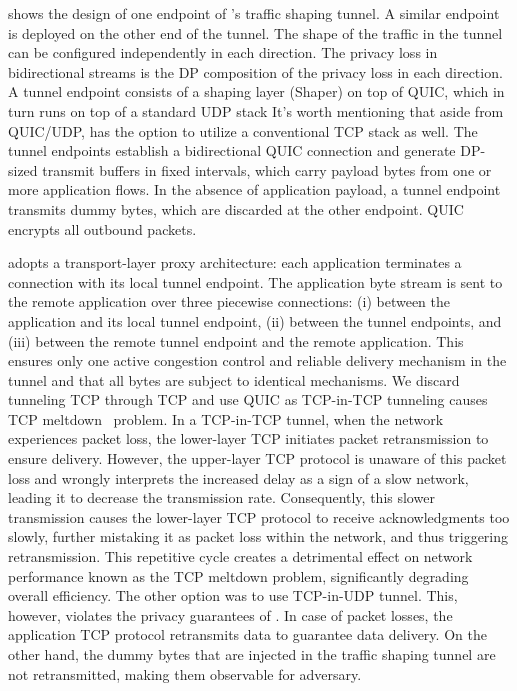  shows the design of one endpoint of {\sys}’s traffic shaping tunnel. A similar endpoint is deployed on the other end of the tunnel.
The shape of the traffic in the tunnel can be configured independently in each direction. The privacy loss in bidirectional streams is the DP composition of the privacy loss in each direction.
A tunnel endpoint consists of a shaping layer (Shaper) on top of QUIC, which in turn runs on top of a standard UDP stack
It's worth mentioning that aside from QUIC/UDP, {\sys} has the option to utilize a conventional TCP stack as well.
The tunnel endpoints establish a bidirectional QUIC connection and generate DP-sized transmit buffers in fixed intervals, which carry payload bytes from one or more application flows.
In the absence of application payload, a tunnel endpoint transmits dummy bytes, which are discarded at the other endpoint.
QUIC encrypts all outbound packets.

{\sys} adopts a transport-layer proxy architecture: each application terminates a connection with its local tunnel endpoint.
The application byte stream is sent to the remote application over three piecewise connections: 
(i) between the application and its local tunnel endpoint,
(ii) between the tunnel endpoints, and
(iii) between the remote tunnel endpoint and the remote application.
This ensures only one active congestion control and reliable delivery mechanism in the tunnel and that all bytes are subject to identical mechanisms.
We discard tunneling TCP through TCP and use QUIC as TCP-in-TCP tunneling causes TCP meltdown~\cite{honda2005tcpovertcp, tcp-meltdown} problem.
In a TCP-in-TCP tunnel, when the network experiences packet loss, the lower-layer TCP initiates packet retransmission to ensure delivery.
However, the upper-layer TCP protocol is unaware of this packet loss and wrongly interprets the increased delay as a sign of a slow network, leading it to decrease the transmission rate.
Consequently, this slower transmission causes the lower-layer TCP protocol to receive acknowledgments too slowly, further mistaking it as packet loss within the network, and thus triggering retransmission.
This repetitive cycle creates a detrimental effect on network performance known as the TCP meltdown problem, significantly degrading overall efficiency.
The other option was to use TCP-in-UDP tunnel. 
This, however, violates the privacy guarantees of {\sys}.
In case of packet losses, the application TCP protocol retransmits data to guarantee data delivery. 
On the other hand, the dummy bytes that are injected in the traffic shaping tunnel are not retransmitted, making them observable for adversary. 
